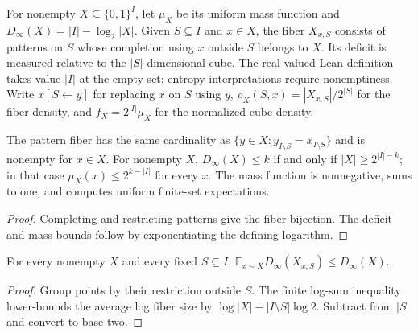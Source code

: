 \begin{definition}
  \label{def:analysis-coordinate-fiber}
  \leanok
  For nonempty $X\subseteq\{0,1\}^I$, let $\mu_X$ be its uniform mass
  function and $D_\infty(X)=|I|-\log_2|X|$. Given $S\subseteq I$ and
  $x\in X$, the fiber $X_{x,S}$ consists of patterns on $S$ whose completion
  using $x$ outside $S$ belongs to $X$. Its deficit is measured relative to
  the $|S|$-dimensional cube. The real-valued Lean definition takes value
  $|I|$ at the empty set; entropy interpretations require nonemptiness.
  Write $x[S\leftarrow y]$ for replacing $x$ on $S$ using $y$,
  $\rho_X(S,x)=|X_{x,S}|/2^{|S|}$ for the fiber density, and
  $f_X=2^{|I|}\mu_X$ for the normalized cube density.
\end{definition}

\begin{theorem}
  \label{thm:analysis-fiber-representation}
  \leanok
  The pattern fiber has the same cardinality as
  $\{y\in X:y_{I\setminus S}=x_{I\setminus S}\}$ and is nonempty for
  $x\in X$. For nonempty $X$, $D_\infty(X)\le k$ if and only if
  $|X|\ge2^{|I|-k}$; in that case $\mu_X(x)\le2^{k-|I|}$ for every $x$.
  The mass function is nonnegative, sums to one, and computes uniform
  finite-set expectations.
\end{theorem}
\begin{proof}
  \leanok
  Completing and restricting patterns give the fiber bijection. The
  deficit and mass bounds follow by exponentiating the defining logarithm.
\end{proof}

\begin{lemma}
  \label{lem:analysis-fiber-entropy}
  \leanok
  For every nonempty $X$ and every fixed $S\subseteq I$,
  $\mathbb E_{x\sim X} D_\infty(X_{x,S})\le D_\infty(X)$.
\end{lemma}
\begin{proof}
  \leanok
  Group points by their restriction outside $S$. The finite log-sum
  inequality lower-bounds the average log fiber size by
  $\log|X|-|I\setminus S|\log2$. Subtract from $|S|$ and convert to base two.
\end{proof}

